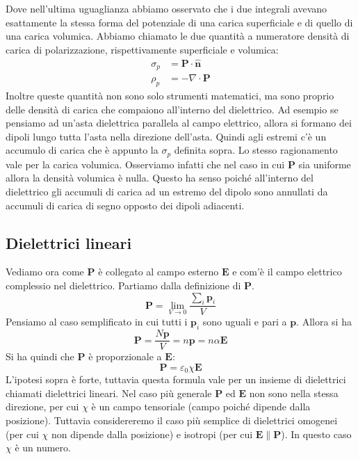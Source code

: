 \documentclass{article}
\renewcommand{\epsilon}{\varepsilon}
\newcommand{\ez}{\epsilon_0}
\newcommand{\mbf}{\mathbf}
\newcommand{\vers}[1]{\mbf{\hat #1 }}
\renewcommand{\div}[1][]{\nabla#1 \cdot}
\numberwithin{equation}{section}
\begin{document}
Dove nell'ultima uguaglianza abbiamo osservato che i due integrali avevano esattamente la stessa forma del potenziale di una carica superficiale e di quello di una carica volumica. Abbiamo chiamato le due quantità a numeratore densità di carica di polarizzazione, rispettivamente superficiale e volumica:
\begin{align}
    \sigma_p    &= \mbf P \cdot \vers n \\
    \rho_p      &= - \div \mbf P
\end{align}
Inoltre queste quantità non sono solo strumenti matematici, ma sono proprio delle densità di carica che compaiono all'interno del dielettrico. Ad esempio se pensiamo ad un'asta dielettrica parallela al campo elettrico, allora si formano dei dipoli lungo tutta l'asta nella direzione dell'asta. Quindi agli estremi c'è un accumulo di carica che è appunto la $\sigma_p$ definita sopra. Lo stesso ragionamento vale per la carica volumica. Osserviamo infatti che nel caso in cui $\mbf P$ sia uniforme allora la densità volumica è nulla. Questo ha senso poiché all'interno del dielettrico gli accumuli di carica ad un estremo del dipolo sono annullati da accumuli di carica di segno opposto dei dipoli adiacenti.


\subsection{Dielettrici lineari} %
\label{sub:dielettrici_lineari}

Vediamo ora come $\mbf P$ è collegato al campo esterno $\mbf E$ e com'è il campo elettrico complessio nel dielettrico. 
Partiamo dalla definizione di $\mbf P$. 
\begin{equation}
    \mbf P = \lim_{V \to 0} \frac{ \sum_i \mbf p_i }{ V } 
\end{equation}
Pensiamo al caso semplificato in cui tutti i $\mbf p_i$ sono uguali e pari a $\mbf p$. Allora si ha 
\begin{equation}
    \mbf P = \frac{ N \mbf p }{ V } = n \mbf p = n \alpha \mbf E
\end{equation}
Si ha quindi che $\mbf P$ è proporzionale a $\mbf E$:
\begin{equation}
    \mbf P = \ez \chi \mbf E
\end{equation}
L'ipotesi sopra è forte, tuttavia questa formula vale per un insieme di dielettrici chiamati dielettrici lineari. Nel caso più generale $\mbf P$ ed $\mbf E$ non sono nella stessa direzione, per cui $\chi$ è un campo tensoriale (campo poiché dipende dalla posizione). Tuttavia considereremo il caso più semplice di dielettrici omogenei (per cui $\chi$ non dipende dalla posizione) e isotropi (per cui $\mbf E \parallel \mbf P$). In questo caso $\chi$ è un numero. 
\end{document}
